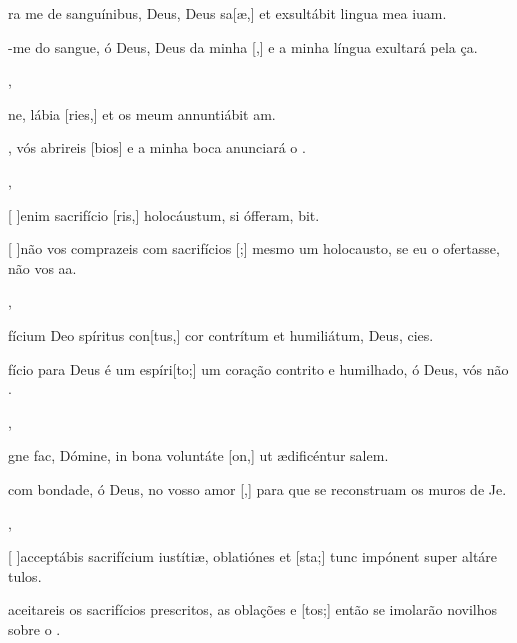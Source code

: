 {  {\item {}ra me de sanguínibus, Deus, Deus sa[æ,] et exsultábit lingua mea iuam.}%
    {\item {}-me do sangue, ó Deus, Deus da minha [,] e a minha língua exultará pela ça.},
  {\item {}ne, lábia [ries,] et os meum annuntiábit am.}%
    {\item {}, vós abrireis [bios] e a minha boca anunciará o .},
  {\item {}[ ]{e}nim sacrifício [ris,] holocáustum, si ófferam, bit.}%
    {\item {}[ ]{não} vos comprazeis com sacrifícios [;] mesmo um holocausto, se eu o ofertasse, não vos aa.},
  {\item {}fícium Deo spíritus con[tus,] cor contrítum et humiliátum, Deus, cies.}%
    {\item {}fício para Deus é um espíri[to;] um coração contrito e humilhado, ó Deus, vós não .},
  {\item {}gne fac, Dómine, in bona voluntáte [on,] ut ædificéntur salem.}%
    {\item {} com bondade, ó Deus, no vosso amor [,] para que se reconstruam os muros de Je.},
  {\item {}[ ]{ac}ceptábis sacrifícium iustítiæ, oblatiónes et [\-sta;] tunc impónent super altáre tu\-los.}%
    {\item {} aceitareis os sacrifícios prescritos, as oblações e [tos;] então se imolarão novilhos sobre o .}
}